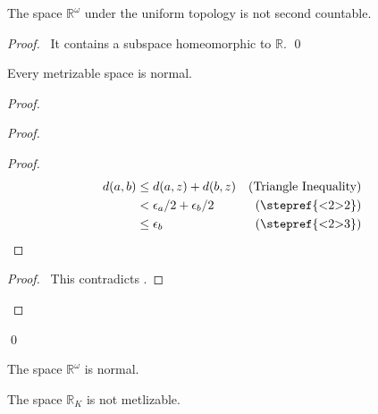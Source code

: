 \begin{prop}
  The space $\mathbb{R}^\omega$ under the uniform topology is not second
countable.
\end{prop}

\begin{proof}
  \pf\ It contains a subspace homeomorphic to $\mathbb{R}$. \qed
\end{proof}

  \begin{thm}[AC]
    \label{thm:topology:metric:normal}
 Every metrizable space is normal.
\end{thm}

\begin{proof}
 \pf
 \begin{proof}
   \begin{proof}
     \pf
     \begin{align*}
       d(a, b) & \leq d(a, z) + d(b, z) & (\text{Triangle Inequality}) \\
       & < \epsilon_a / 2 + \epsilon_b / 2 & (\text{\stepref{<2>2}}) \\
       & \leq \epsilon_b & (\text{\stepref{<2>3}})
     \end{align*}
   \end{proof}
   \qedstep
   \begin{proof}
     \pf\ This contradicts .
   \end{proof}
 \end{proof}
 \qed
\end{proof}

\begin{cor}
  The space $\mathbb{R}^\omega$ is normal.
\end{cor}

\begin{cor}
  The space $\mathbb{R}_K$ is not metlizable.
\end{cor}

